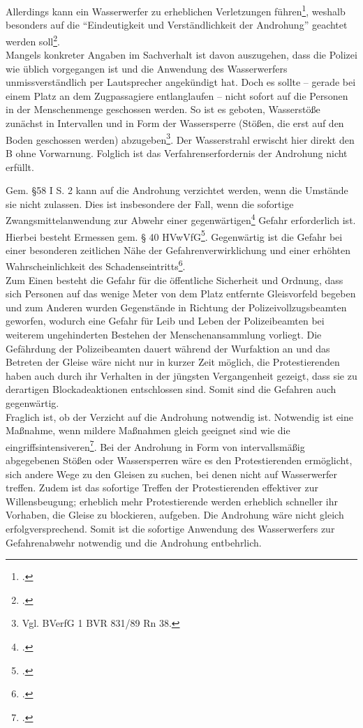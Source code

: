 \documentclass[widefront, ngerman]{jura}
\begin{document}
Allerdings kann ein Wasserwerfer zu erheblichen Verletzungen führen\footcite[Rachor][F Rn 901]{HandbuchPolizeirecht}, weshalb besonders auf die "`Eindeutigkeit und Verständlichkeit der Androhung"' geachtet werden soll\footcite[Anmerkungen zu §39, S. 118]{MusterentwurfPolizeigesetz}.\\
Mangels konkreter Angaben im Sachverhalt ist davon auszugehen, dass die Polizei wie üblich vorgegangen ist und die Anwendung des Wasserwerfers unmissverständlich per Lautsprecher angekündigt hat. Doch es sollte -- gerade bei einem Platz an dem Zugpassagiere entlanglaufen -- nicht sofort auf die Personen in der Menschenmenge geschossen werden. So ist es geboten, Wasserstöße zunächst in Intervallen und in Form der Wassersperre (Stößen, die erst auf den Boden geschossen werden) abzugeben\footnote{Vgl. BVerfG 1 BVR 831/89 Rn 38.}. Der Wasserstrahl erwischt hier direkt den B ohne Vorwarnung. Folglich ist das Verfahrenserfordernis der Androhung nicht erfüllt.

Gem. §58 I S. 2 kann auf die Androhung verzichtet werden, wenn die Umstände sie nicht zulassen. Dies ist insbesondere der Fall, wenn die sofortige Zwangsmittelanwendung zur Abwehr einer gegenwärtigen\footcite[§58 Rn 3]{MeixnerFriedrich} Gefahr erforderlich ist. Hierbei besteht Ermessen gem. § 40 HVwVfG\footcite[§58 Rn 5]{HornmannHSOG}. Gegenwärtig ist die Gefahr bei einer besonderen zeitlichen Nähe der Gefahrenverwirklichung und einer erhöhten Wahrscheinlichkeit des Schadenseintritts\footcite[Rn 78]{Schenke}.\\
Zum Einen besteht die Gefahr für die öffentliche Sicherheit und Ordnung, dass sich Personen auf das wenige Meter von dem Platz entfernte Gleisvorfeld begeben und zum Anderen wurden Gegenstände in Richtung der Polizeivollzugsbeamten geworfen, wodurch eine Gefahr für Leib und Leben der Polizeibeamten bei weiterem ungehinderten Bestehen der Menschenansammlung vorliegt. Die Gefährdung der Polizeibeamten dauert während der Wurfaktion an und das Betreten der Gleise wäre nicht nur in kurzer Zeit möglich, die Protestierenden haben auch durch ihr Verhalten in der jüngsten Vergangenheit gezeigt, dass sie zu derartigen Blockadeaktionen entschlossen sind. Somit sind die Gefahren auch gegenwärtig.\\
Fraglich ist, ob der Verzicht auf die Androhung notwendig ist. Notwendig ist eine Maßnahme, wenn mildere Maßnahmen gleich geeignet sind wie die eingriffsintensiveren\footcite[Rachor][F Rn 214]{HandbuchPolizeirecht}. Bei der Androhung in Form von intervallsmäßig abgegebenen Stößen oder Wassersperren wäre es den Protestierenden ermöglicht, sich andere Wege zu den Gleisen zu suchen, bei denen nicht auf Wasserwerfer treffen. Zudem ist das sofortige Treffen der Protestierenden effektiver zur Willensbeugung; erheblich mehr Protestierende werden erheblich schneller ihr Vorhaben, die Gleise zu blockieren, aufgeben. Die Androhung wäre nicht gleich erfolgversprechend. Somit ist die sofortige Anwendung des Wasserwerfers zur Gefahrenabwehr notwendig und die Androhung entbehrlich.
\end{document}
